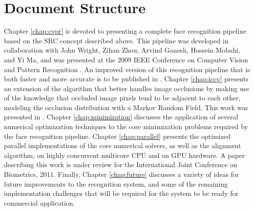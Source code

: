 \section{Document Structure}
%
Chapter \ref{chap:cvpr} is devoted to presenting a complete face
recognition pipeline based on the SRC concept described above. 
This pipeline was developed in collaboration with John Wright,
Zihan Zhou, Arvind Ganesh, Hossein Mobahi, and Yi Ma, and was
presented at the 2009 IEEE Conference on Computer Vision and Pattern Recognition
\cite{WagnerA2009-CVPR}.  An improved version of this recognition pipeline that
is both faster and more accurate is to be published in \cite{WagnerA2011-PAMI}.
%
Chapter \ref{chap:iccv} presents an extension of the algorithm that better
handles image occlusions by making use of the knowledge that occluded image
pixels tend to be adjacent to each other, modeling the occlusion distribution
with a Markov Random Field.  This work was presented in \cite{ZhouZ2009}.
%
Chapter \ref{chap:minimization} discusses the application of several numerical
optimization techniques to the core minimization problems required by the face
recognition pipeline.
%
Chapter \ref{chap:parallel} presents the optimized parallel implementations of
the core numerical solvers, as well as the alignment algorithm, on highly
concurrent multicore CPU and on GPU hardware.  A paper describing this work
is under review for the International Joint Conference on Biometrics, 2011.
%
Finally, Chapter \ref{chap:future} discusses a variety of ideas for future
improvements to the recognition system, and some of the remaining
implementation challenges that will be required for the system to be ready for
commercial application.
 
